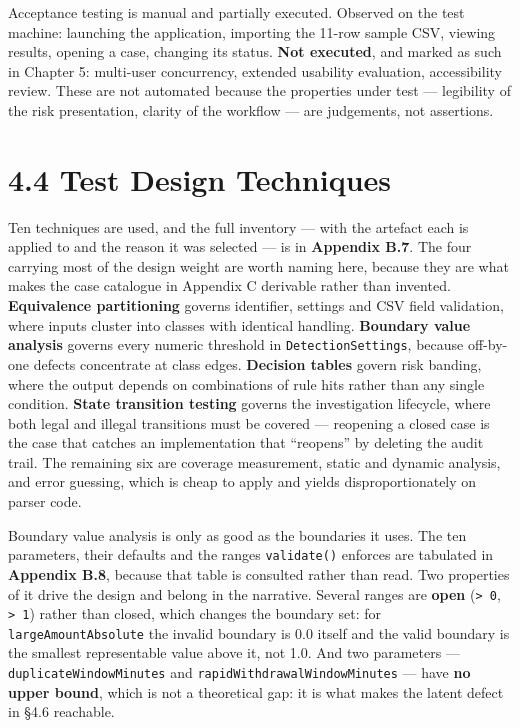 \documentclass[
  12pt,
]{report}
\begin{document}
Acceptance testing is manual and partially executed. Observed on the
test machine: launching the application, importing the 11-row sample
CSV, viewing results, opening a case, changing its status. \textbf{Not
executed}, and marked as such in Chapter 5: multi-user concurrency,
extended usability evaluation, accessibility review. These are not
automated because the properties under test --- legibility of the risk
presentation, clarity of the workflow --- are judgements, not
assertions.

\section{4.4 Test Design Techniques}\label{test-design-techniques}

Ten techniques are used, and the full inventory --- with the artefact
each is applied to and the reason it was selected --- is in
\textbf{Appendix B.7}. The four carrying most of the design weight are
worth naming here, because they are what makes the case catalogue in
Appendix C derivable rather than invented. \textbf{Equivalence
partitioning} governs identifier, settings and CSV field validation,
where inputs cluster into classes with identical handling.
\textbf{Boundary value analysis} governs every numeric threshold in
\texttt{Detection\-Settings}, because off-by-one defects concentrate at
class edges. \textbf{Decision tables} govern risk banding, where the
output depends on combinations of rule hits rather than any single
condition. \textbf{State transition testing} governs the investigation
lifecycle, where both legal and illegal transitions must be covered ---
reopening a closed case is the case that catches an implementation that
``reopens'' by deleting the audit trail. The remaining six are coverage
measurement, static and dynamic analysis, and error guessing, which is
cheap to apply and yields disproportionately on parser code.

Boundary value analysis is only as good as the boundaries it uses. The
ten parameters, their defaults and the ranges \texttt{validate()}
enforces are tabulated in \textbf{Appendix B.8}, because that table is
consulted rather than read. Two properties of it drive the design and
belong in the narrative. Several ranges are \textbf{open}
(\texttt{\textgreater{}\ 0}, \texttt{\textgreater{}\ 1}) rather than
closed, which changes the boundary set: for \texttt{large\-Amount\-Absolute}
the invalid boundary is 0.0 itself and the valid boundary is the
smallest representable value above it, not 1.0. And two parameters ---
\texttt{duplicate\-Window\-Minutes} and
\texttt{rapid\-Withdrawal\-Window\-Minutes} --- have \textbf{no upper bound},
which is not a theoretical gap: it is what makes the latent defect in
§4.6 reachable.
\end{document}
